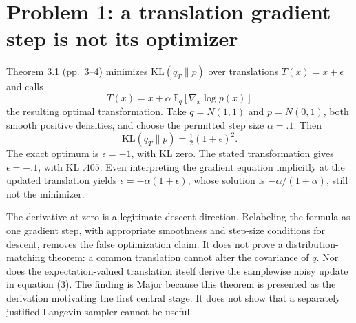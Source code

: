 \documentclass[10pt]{article}
\begin{document}
\section*{Problem 1: a translation gradient step is not its optimizer}
Theorem 3.1 (pp. 3–4) minimizes \(\mathrm{KL}(q_T\|p)\) over translations \(T(x)=x+\epsilon\) and calls \[T(x)=x+\alpha\,\mathbb E_q[\nabla_x\log p(x)]\] the resulting optimal transformation. Take \(q=N(1,1)\) and \(p=N(0,1)\), both smooth positive densities, and choose the permitted step size \(\alpha=.1\). Then \[\mathrm{KL}(q_T\|p)=\tfrac12(1+\epsilon)^2.\] The exact optimum is \(\epsilon=-1\), with KL zero. The stated transformation gives \(\epsilon=-.1\), with KL \(.405\). Even interpreting the gradient equation implicitly at the updated translation yields \(\epsilon=-\alpha(1+\epsilon)\), whose solution is \(-\alpha/(1+\alpha)\), still not the minimizer.\par
The derivative at zero is a legitimate descent direction. Relabeling the formula as one gradient step, with appropriate smoothness and step-size conditions for descent, removes the false optimization claim. It does not prove a distribution-matching theorem: a common translation cannot alter the covariance of \(q\). Nor does the expectation-valued translation itself derive the samplewise noisy update in equation (3). The finding is Major because this theorem is presented as the derivation motivating the first central stage. It does not show that a separately justified Langevin sampler cannot be useful.\par
\end{document}
